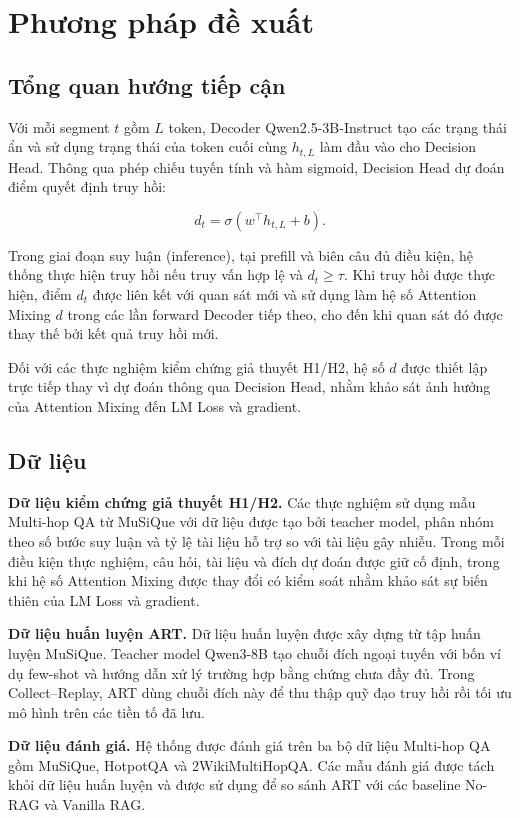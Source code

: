 \chapter{Phương pháp đề xuất}
\label{chap:method}
\section{Tổng quan hướng tiếp cận}
Với mỗi segment \(t\) gồm \(L\) token, Decoder Qwen2.5-3B-Instruct tạo các trạng thái ẩn và sử dụng trạng thái của token cuối cùng \(h_{t,L}\) làm đầu vào cho Decision Head. Thông qua phép chiếu tuyến tính và hàm sigmoid, Decision Head dự đoán điểm quyết định truy hồi:

\begin{equation}d_t = \sigma(w^\top h_{t,L} + b).\label{eq:gate}\end{equation}

Trong giai đoạn suy luận (inference), tại prefill và biên câu đủ điều kiện, hệ thống thực hiện truy hồi nếu truy vấn hợp lệ và \(d_t \geq \tau\). Khi truy hồi được thực hiện, điểm \(d_t\) được liên kết với quan sát mới và sử dụng làm hệ số Attention Mixing \(d\) trong các lần forward Decoder tiếp theo, cho đến khi quan sát đó được thay thế bởi kết quả truy hồi mới.

Đối với các thực nghiệm kiểm chứng giả thuyết H1/H2, hệ số \(d\) được thiết lập trực tiếp thay vì dự đoán thông qua Decision Head, nhằm khảo sát ảnh hưởng của Attention Mixing đến LM Loss và gradient.

\section{Dữ liệu}
\textbf{Dữ liệu kiểm chứng giả thuyết H1/H2.} Các thực nghiệm sử dụng mẫu Multi-hop QA từ MuSiQue với dữ liệu được tạo bởi teacher model, phân nhóm theo số bước suy luận và tỷ lệ tài liệu hỗ trợ so với tài liệu gây nhiễu. Trong mỗi điều kiện thực nghiệm, câu hỏi, tài liệu và đích dự đoán được giữ cố định, trong khi hệ số Attention Mixing được thay đổi có kiểm soát nhằm khảo sát sự biến thiên của LM Loss và gradient.

\textbf{Dữ liệu huấn luyện ART.} Dữ liệu huấn luyện được xây dựng từ tập huấn luyện MuSiQue. Teacher model Qwen3-8B tạo chuỗi đích ngoại tuyến với bốn ví dụ few-shot và hướng dẫn xử lý trường hợp bằng chứng chưa đầy đủ. Trong Collect–Replay, ART dùng chuỗi đích này để thu thập quỹ đạo truy hồi rồi tối ưu mô hình trên các tiền tố đã lưu.

\textbf{Dữ liệu đánh giá.} Hệ thống được đánh giá trên ba bộ dữ liệu Multi-hop QA gồm MuSiQue, HotpotQA và 2WikiMultiHopQA. Các mẫu đánh giá được tách khỏi dữ liệu huấn luyện và được sử dụng để so sánh ART với các baseline No-RAG và Vanilla RAG\cite{musique,hotpot,twowiki}.

